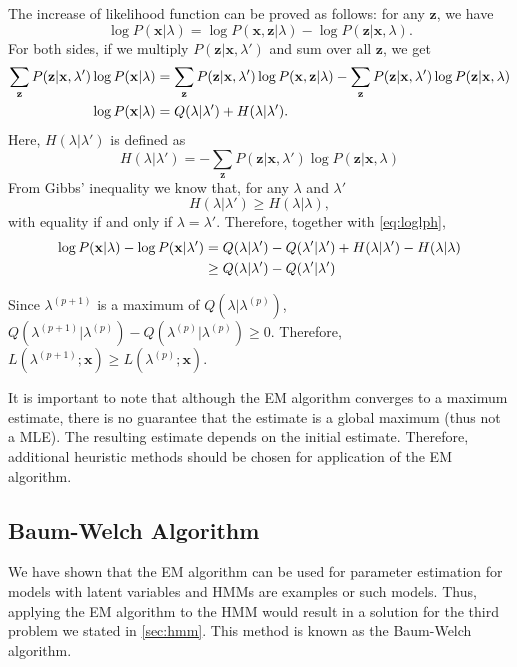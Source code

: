 \documentclass[12pt,final,twoside]{report}
\theoremstyle{plain}
\theoremstyle{definition}
\theoremstyle{remark}
\begin{document}
The increase of likelihood function can be proved as follows: for any $\mathbf{z}$, we have
\begin{equation}
  \log P(\mathbf{x}|\lambda) = \log P(\mathbf{x},\mathbf{z}|\lambda) - \log P(\mathbf{z}|\mathbf{x},\lambda). 
\end{equation}
For both sides, if we multiply $P(\mathbf{z}|\mathbf{x},\lambda')$ and sum over all $\mathbf{z}$, we get
\begin{align}
  \sum_{\mathbf{z}} P(\mathbf{z}|\mathbf{x},\lambda') \log P(\mathbf{x}|\lambda) 
    &= \sum_{\mathbf{z}} P(\mathbf{z}|\mathbf{x},\lambda') \log P(\mathbf{x},\mathbf{z}|\lambda)
    - \sum_{\mathbf{z}} P(\mathbf{z}|\mathbf{x},\lambda') \log P(\mathbf{z}|\mathbf{x},\lambda) \notag\\
  \log P(\mathbf{x}|\lambda) &= Q(\lambda|\lambda') + H(\lambda|\lambda')
  \label{eq:loglph}.
\end{align}
Here, $H(\lambda|\lambda')$ is defined as
\begin{equation}
  H(\lambda|\lambda') = - \sum_{\mathbf{z}} P(\mathbf{z}|\mathbf{x},\lambda') \log P(\mathbf{z}|\mathbf{x},\lambda)
\end{equation}
From Gibbs' inequality we know that, for any $\lambda$ and $\lambda'$
\begin{equation}
  H(\lambda|\lambda') \geq H(\lambda|\lambda),
\end{equation}
with equality if and only if $\lambda = \lambda'$. Therefore, together with \cref{eq:loglph},
\begin{align}
  \log P(\mathbf{x}|\lambda) - \log P(\mathbf{x}|\lambda') &= Q(\lambda|\lambda') - Q(\lambda'|\lambda') + H(\lambda|\lambda') -  H(\lambda|\lambda) \notag\\
  & \geq Q(\lambda|\lambda') - Q(\lambda'|\lambda')
\end{align}

Since $\lambda^{(p+1)}$ is a maximum of $Q(\lambda|\lambda^{(p)})$, $Q(\lambda^{(p+1)}|\lambda^{(p)}) - Q(\lambda^{(p)}|\lambda^{(p)}) \geq 0$. Therefore, $L(\lambda^{(p+1)};\mathbf{x}) \geq L(\lambda^{(p)};\mathbf{x})$.
  
It is important to note that although the EM algorithm converges to a maximum estimate, there is no guarantee that the estimate is a global maximum (thus not a MLE). The resulting estimate depends on the initial estimate. Therefore, additional heuristic methods should be chosen for application of the EM algorithm.

\subsection{Baum-Welch Algorithm}
We have shown that the EM algorithm can be used for parameter estimation for models with latent variables and HMMs are examples or such models. Thus, applying the EM algorithm to the HMM would result in a solution for the third problem we stated in \cref{sec:hmm}. This method is known as the Baum-Welch algorithm.
\end{document}
